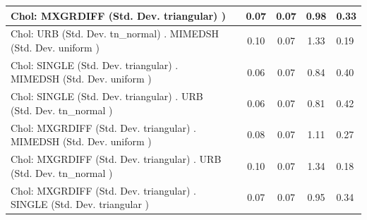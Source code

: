 \begin{table}
\begin{center}
\begin{tabular}{|l|l|c|c|c|l|}
			\hline
			 Chol: MXGRDIFF (Std. Dev. triangular) ) &  & 0.07 & 0.07 & 0.98 & 0.33 \\
			\hline
			 Chol: URB (Std. Dev. tn_normal) . MIMEDSH (Std. Dev.   uniform ) &  & 0.10 & 0.07 & 1.33 & 0.19 \\
			\hline
			 Chol: SINGLE (Std. Dev. triangular) . MIMEDSH (Std. Dev.   uniform ) &  & 0.06 & 0.07 & 0.84 & 0.40 \\
			\hline
			 Chol: SINGLE (Std. Dev. triangular) . URB (Std. Dev.   tn_normal ) &  & 0.06 & 0.07 & 0.81 & 0.42 \\
			\hline
			 Chol: MXGRDIFF (Std. Dev. triangular) . MIMEDSH (Std. Dev.   uniform ) &  & 0.08 & 0.07 & 1.11 & 0.27 \\
			\hline
			 Chol: MXGRDIFF (Std. Dev. triangular) . URB (Std. Dev.   tn_normal ) &  & 0.10 & 0.07 & 1.34 & 0.18 \\
			\hline
			 Chol: MXGRDIFF (Std. Dev. triangular) . SINGLE (Std. Dev.   triangular ) &  & 0.07 & 0.07 & 0.95 & 0.34 \\
			\hline
		\end{tabular}
	\end{center}
\end{table}